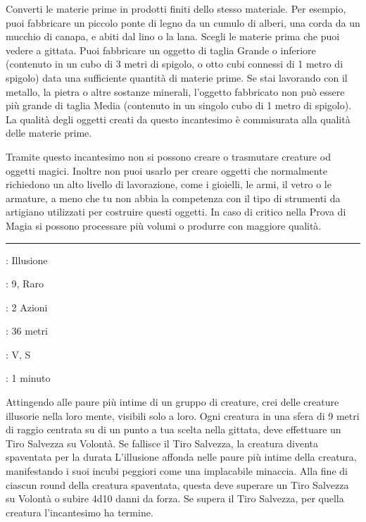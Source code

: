 \begin{multicols}{2}
Converti le materie prime in prodotti finiti dello stesso materiale. Per esempio, puoi fabbricare un piccolo ponte di legno da un cumulo di alberi, una corda da un mucchio di canapa, e abiti dal lino o la lana. Scegli le materie prima che puoi vedere a gittata. Puoi fabbricare un oggetto di taglia Grande o inferiore (contenuto in un cubo di 3 metri di spigolo, o otto cubi connessi di 1 metro di spigolo) data una sufficiente quantità di materie prime. Se stai lavorando con il metallo, la pietra o altre sostanze minerali, l'oggetto fabbricato non può essere più grande di taglia Media (contenuto in un singolo cubo di 1 metro di spigolo). La qualità degli oggetti creati da questo incantesimo è commisurata alla qualità delle materie prime.

Tramite questo incantesimo non si possono creare o trasmutare creature od oggetti magici. Inoltre non puoi usarlo per creare oggetti che normalmente richiedono un alto livello di lavorazione, come i gioielli, le armi, il vetro o le armature, a meno che tu non abbia la competenza con il tipo di strumenti da artigiano utilizzati per costruire questi oggetti. In caso di critico nella Prova di Magia si possono processare più volumi o produrre con maggiore qualità.

\smallskip\noindent\rule{\linewidth}{2pt} \hypertarget{Fatale}{}\smallskip{}
\noindent
\begin{description}[noitemsep, topsep=0pt, parsep=0pt, partopsep=0pt, leftmargin=0cm, labelwidth=2.8cm]
	\item[\textbf{Lista di Magia}]: Illusione
	\item[\textbf{Livello}]: 9, Raro
	\item[\textbf{T. di Lancio}]: 2 Azioni
	\item[\textbf{Gittata}]: 36 metri
	\item[\textbf{Componenti}]: V, S
	\item[\textbf{Durata}]: 1 minuto
\end{description}

Attingendo alle paure più intime di un gruppo di creature, crei delle creature illusorie nella loro mente, visibili solo a loro. Ogni creatura in una sfera di 9 metri di raggio centrata su di un punto a tua scelta nella gittata, deve effettuare un Tiro Salvezza su Volontà. Se fallisce il Tiro Salvezza, la creatura diventa spaventata per la durata L'illusione affonda nelle paure più intime della creatura, manifestando i suoi incubi peggiori come una implacabile minaccia. Alla fine di ciascun round della creatura spaventata, questa deve superare un Tiro Salvezza su Volontà o subire 4d10 danni da forza. Se supera il Tiro Salvezza, per quella creatura l'incantesimo ha termine.


\end{multicols}

